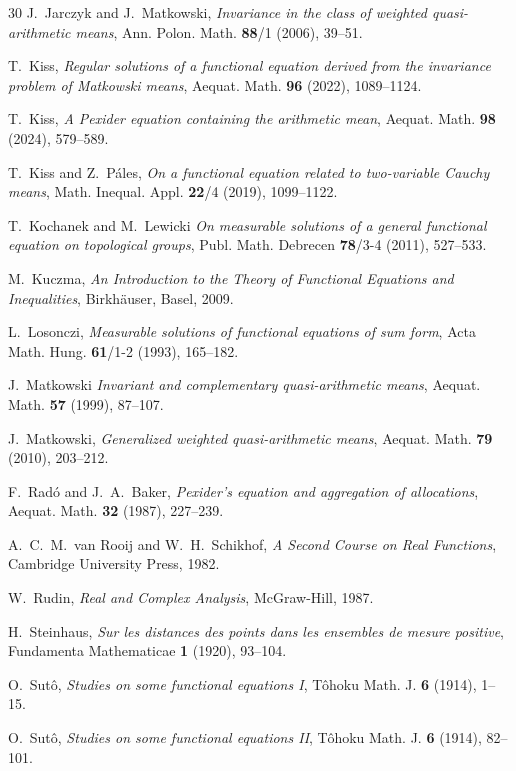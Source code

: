 \documentclass[12pt]{amsart}
\theoremstyle{remark}
\theoremstyle{definition}
\begin{document}
\begin{thebibliography}{30}
J.~Jarczyk and J.~Matkowski, 
{\em Invariance in the class of weighted 
quasi-arithmetic means}, 
Ann. Polon. Math. {\bf 88}/1 (2006), 39--51. 

T.~Kiss, 
{\em Regular solutions of a functional equation 
derived from the invariance problem of 
Matkowski means}, 
Aequat. Math. \textbf{96} (2022), 1089--1124. 

T.~Kiss, 
{\em A Pexider equation containing the arithmetic mean}, 
Aequat. Math. \textbf{98} (2024), 579--589. 

T.~Kiss and Z.~P\'ales, 
{\em On a functional equation related to 
two-variable Cauchy means}, 
Math. Inequal. Appl. \textbf{22}/4 (2019), 1099--1122. 

T.~Kochanek and M.~Lewicki 
{\em On measurable solutions of a general 
functional equation on topological groups}, 
Publ. Math. Debrecen  {\bf 78}/3-4 (2011), 527--533. 

M.~Kuczma, 
{\em An Introduction to the Theory of
Functional Equations and Inequalities}, 
Birkhäuser, Basel, 2009. 

L.~Losonczi, 
{\em Measurable solutions of 
functional equations of sum form}, 
Acta Math. Hung. {\bf 61}/1-2 (1993), 165--182. 

J.~Matkowski 
{\em Invariant and complementary 
quasi-arithmetic means}, 
Aequat. Math. {\bf 57} (1999), 87--107. 

J.~Matkowski, 
{\em Generalized weighted quasi-arithmetic means}, 
Aequat. Math. \textbf{79} (2010), 203--212. 

F.~Rad\'o and J.~A.~Baker, 
{\em Pexider's equation and aggregation of allocations}, 
Aequat. Math. \textbf{32} (1987), 227--239.

A.~C.~M.~van Rooij and W.~H.~Schikhof, 
{\em A Second Course on Real Functions}, 
Cambridge University Press, 1982.

W.~Rudin, 
{\em Real and Complex Analysis}, 
McGraw-Hill, 1987. 

H.~Steinhaus, 
{\em Sur les distances des points dans 
les ensembles de mesure positive}, 
Fundamenta Mathematicae \textbf{1} (1920), 93--104.

O.~Sut\^o, 
{\em Studies on some functional equations I}, 
T\^ohoku Math. J. {\bf 6} (1914), 1--15. 

O.~Sut\^o, 
{\em Studies on some functional equations II}, 
T\^ohoku Math. J. {\bf 6} (1914), 82--101. 

\end{thebibliography} 
\end{document}
